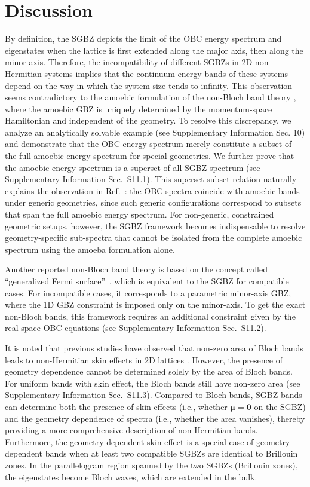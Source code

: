 \documentclass[pdflatex,sn-nature,iicol]{sn-jnl}
\theoremstyle{thmstyleone}%
\theoremstyle{thmstyletwo}%
\theoremstyle{thmstylethree}%
\begin{document}
\section{Discussion}
By definition, the SGBZ depicts the limit of the OBC energy spectrum and eigenstates when the lattice is first extended along the major axis, then along the minor axis. 
Therefore, the incompatibility of different SGBZs in 2D non-Hermitian systems implies that the continuum energy bands of these systems depend on the way in which the system size tends to infinity. 
This observation seems contradictory to the amoebic formulation of the non-Bloch band theory \cite{wangAmoebaFormulationNonBloch2024}, where the amoebic GBZ is uniquely determined by the momentum-space Hamiltonian and independent of the geometry.
To resolve this discrepancy, we analyze an analytically solvable example (see Supplementary Information Sec. 10) and demonstrate that the OBC energy spectrum merely constitute a subset of the full amoebic energy spectrum for special geometries.
We further prove that the amoebic energy spectrum is a superset of all SGBZ spectrum (see Supplementary Information Sec.~S11.1). 
This superset-subset relation naturally explains the observation in Ref.~\cite{wangAmoebaFormulationNonBloch2024}: the OBC spectra coincide with amoebic bands under generic geometries, since such generic configurations correspond to subsets that span the full amoebic energy spectrum. For non-generic, constrained geometric setups, however, the SGBZ framework becomes indispensable to resolve geometry-specific sub-spectra that cannot be isolated from the complete amoebic spectrum using the amoeba formulation alone. 


Another reported non-Bloch band theory is based on the concept called ``generalized Fermi surface''~\cite{zhangAlgebraicNonHermitianSkin2025}, which is equivalent to the SGBZ for compatible cases. 
For incompatible cases, it corresponds to a parametric minor-axis GBZ, where the 1D GBZ constraint is imposed only on the minor-axis. 
To get the exact non-Bloch bands, this framework requires an additional constraint given by the real-space OBC equations (see Supplementary Information Sec.~S11.2).


It is noted that previous studies have observed that
non-zero area of Bloch bands leads to non-Hermitian skin effects in
2D lattices \cite{zhangUniversalNonHermitianSkin2022,zhangDynamicalDegeneracySplitting2023,wanObservationGeometrydependentSkin2023}. However, the presence of geometry dependence cannot be determined solely by the area of Bloch bands. For uniform bands with skin effect, the Bloch bands still have non-zero area (see Supplementary Information Sec.~S11.3).
Compared to Bloch bands, SGBZ bands can determine both the presence
of skin effects (i.e., whether $\boldsymbol{\mu}=\boldsymbol{0}$
on the SGBZ) and the geometry dependence of spectra (i.e., whether
the area vanishes), thereby providing a more comprehensive description
of non-Hermitian bands. Furthermore, the geometry-dependent skin effect is a special case of geometry-dependent bands when at least two compatible SGBZs are identical to Brillouin zones. In the parallelogram region spanned by the two SGBZs (Brillouin zones), the eigenstates become Bloch waves, which are extended in the bulk.
\end{document}

